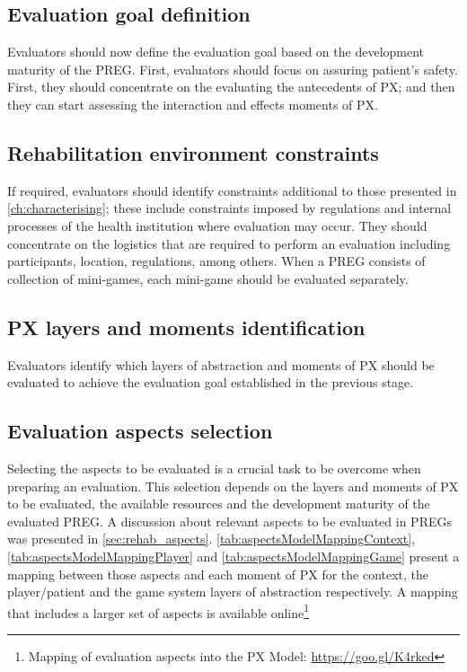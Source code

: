 \subsection{Evaluation goal definition}
Evaluators should now define the evaluation goal based on the development maturity of the \ac{PREG}. First, evaluators should focus on assuring patient’s safety. First, they should concentrate on the evaluating the antecedents of \ac{PX}; and then they can start assessing the interaction and effects moments of \ac{PX}.

\subsection{Rehabilitation environment constraints}
If required, evaluators should identify constraints additional to those presented in \autoref{ch:characterising}; these include constraints imposed by regulations and internal processes of the health institution where evaluation may occur. They should concentrate on the logistics that are required to perform an evaluation including participants, location, regulations, among others. When a \ac{PREG} consists of collection of mini-games, each mini-game should be evaluated separately.

\subsection{\ac{PX} layers and moments identification}
Evaluators identify which layers of abstraction and moments of \ac{PX} should be evaluated to achieve the evaluation goal established in the previous stage.

\subsection{Evaluation aspects selection}
Selecting the aspects to be evaluated is a crucial task to be overcome when preparing an evaluation. This selection depends on the layers and moments of \ac{PX} to be evaluated, the available resources and the development maturity of the evaluated \ac{PREG}. A discussion about relevant aspects to be evaluated in \acp{PREG} was presented in \autoref{sec:rehab_aspects}. \autoref{tab:aspectsModelMappingContext}, \autoref{tab:aspectsModelMappingPlayer} and \autoref{tab:aspectsModelMappingGame} present a mapping between those aspects and each moment of \ac{PX} for the context, the player/patient and the game system layers of abstraction respectively. A mapping that includes a larger set of aspects is available online\footnote{Mapping of evaluation aspects into the PX Model: \url{https://goo.gl/K4rked}}

